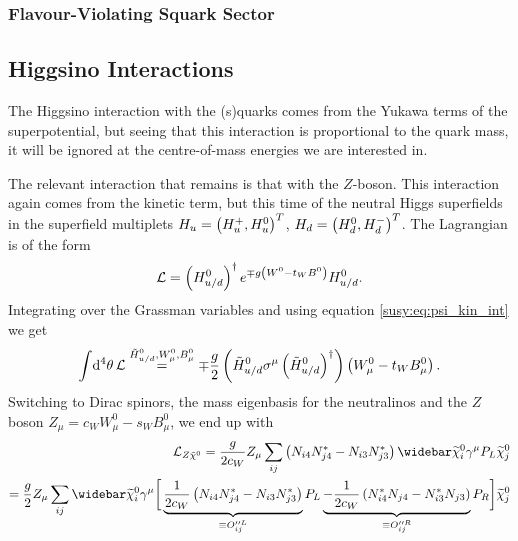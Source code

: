 \documentclass[../main.tex]{subfiles}
\begin{document}
\subsubsection*{Flavour-Violating Squark Sector}


\subsection{Higgsino Interactions}
The Higgsino interaction with the (s)quarks comes from the Yukawa terms of the
superpotential, but seeing that this interaction is proportional to the quark
mass, it will be ignored at the centre-of-mass energies we are interested in.

The relevant interaction that remains is that with the \(Z\)-boson. This
interaction again comes from the kinetic term, but this time of the neutral
Higgs superfields in the superfield multiplets \(H_u = \left(H_u^+,
  H_u^0\right)^T\), \(H_d = \left(H_d^0, H_d^-\right)^T\). The Lagrangian is of the form
\begin{equation}
  \mathcal{L} = \left(H_{u/d}^0\right)^\dagger e^{\mp g\left(W^0 - t_W B^0\right)} H_{u/d}^0.
\end{equation}
Integrating over the Grassman variables and using equation \cref{susy:eq:psi_kin_int} we get
\begin{equation}
  \int \!\mathrm{d}^4\theta\, \mathcal{L} \stackrel{\tilde{H}_{u/d}^0, W^0_\mu, B^0_\mu}{=} \mp \frac{g}{2} \left(\tilde{H}_{u/d}^0 \sigma^\mu \left(\tilde{H}_{u/d}^0\right)^\dagger\right)\left(W^0_\mu - t_W B_\mu^0\right).
\end{equation}
Switching to Dirac spinors, the mass eigenbasis for the neutralinos and the \(Z\) boson \(Z_\mu = c_W W^0_\mu - s_W B^0_\mu\), we end up with
\begin{align}
  \nonumber
  \L_{Z \tilde{\chi}^0} = \frac{g}{2c_W} Z_\mu \sum_{ij}\pclosed{N_{i4}N_{j4}^\ast - N_{i3}N_{j3}^\ast} \barnino[i] \gamma^\mu P_L \nino[j] \\
  = \frac{g}{2} Z_\mu \sum_{ij}\barnino[i] \gamma^\mu \bigg[ \underbrace{\frac{1}{2c_W}\pclosed{N_{i4}N_{j4}^\ast - N_{i3}N_{j3}^\ast}}_{\equiv O^{\prime\prime L}_{ij}} P_L \underbrace{-\frac{1}{2c_W}\pclosed{N_{i4}^\ast N_{j4} - N_{i3}^\ast N_{j3}}}_{\equiv O^{\prime\prime R}_{ij}} P_R \bigg] \nino[j]
\end{align}
\end{document}
